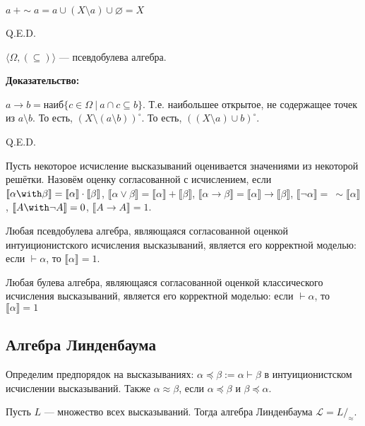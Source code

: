 $a\ +\sim a = a \cup (X \setminus a) \cup \varnothing = X$

\hfill Q.E.D.

$\langle \Omega, (\subseteq) \rangle$ --- псевдобулева алгебра.



\textbf{Доказательство:}

$a \rightarrow b = \text{наиб}\{ c \in \Omega\ |\ a \cap c \subseteq b\}$. 
Т.е. наибольшее открытое, не содержащее точек из $a \setminus b$.
То есть, $(X \setminus (a \setminus b))^\circ$. То есть, $((X \setminus a) \cup b)^\circ$.

\hfill Q.E.D.

 Пусть некоторое исчисление высказываний оценивается значениями из некоторой решётки.
Назовём оценку согласованной с исчислением, если 
$\llbracket\alpha\with\beta\rrbracket = \llbracket\alpha\rrbracket\cdot\llbracket\beta\rrbracket$,
$\llbracket\alpha\vee\beta\rrbracket = \llbracket\alpha\rrbracket+\llbracket\beta\rrbracket$,
$\llbracket\alpha\rightarrow\beta\rrbracket = \llbracket\alpha\rrbracket\rightarrow\llbracket\beta\rrbracket$,
$\llbracket\neg\alpha\rrbracket =\ \sim\llbracket\alpha\rrbracket$,
$\llbracket A \with\neg A\rrbracket = 0$, $\llbracket A\rightarrow A \rrbracket = 1$.


Любая псевдобулева алгебра, являющаяся согласованной оценкой интуиционистского исчисления высказываний,
является его корректной моделью: если $\vdash\alpha$, то $\llbracket\alpha\rrbracket = 1$.



Любая булева алгебра, являющаяся согласованной оценкой классического исчисления высказываний, 
является его корректной моделью: если $\vdash\alpha$, то $\llbracket\alpha\rrbracket = 1$


\subsection{Алгебра Линденбаума}

 Определим предпорядок на высказываниях: $\alpha \preceq \beta := \alpha \vdash \beta$ в интуиционистском исчислении высказываний.
Также $\alpha\approx\beta$, если $\alpha\preceq\beta$ и $\beta\preceq\alpha$.

 Пусть $L$ --- множество всех высказываний. Тогда алгебра Линденбаума $\mathcal{L} = L/_\approx$.



